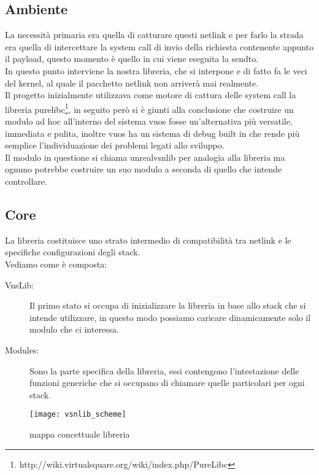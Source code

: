\subsection{Ambiente}
La necessit\`a primaria era quella di catturare questi netlink e per farlo la strada era quella di intercettare la system call di invio della richiesta contenente appunto il payload, questo momento \`e quello in cui viene eseguita la sendto.\\
In questo punto interviene la nostra libreria, che si interpone e di fatto fa le veci del kernel, al quale il pacchetto netlink non arriver\`a mai realmente.\\
Il progetto inizialmente utilizzava come motore di cattura delle system call la libreria purelibc\footnote{http://wiki.virtualsquare.org/wiki/index.php/PureLibc}, in seguito per\`o si \`e giunti alla conclusione che costruire un modulo ad hoc all'interno del sistema vuos fosse un'alternativa pi\`u versatile, immediata e pulita, inoltre vuos ha un sistema di debug built in che rende pi\`u semplice l'individuazione dei problemi legati allo sviluppo.\\
Il modulo in questione si chiama unrealvsnlib per analogia alla libreria ma ognuno potrebbe costruire un suo modulo a seconda di quello che intende controllare.\\

\subsection{Core}
La libreria costituisce uno strato  intermedio di compatibilit\`a tra netlink e le specifiche configurazioni degli stack.\\
Vediamo come \`e composta:
\begin{description}                     %
  \item[VnsLib:] Il primo stato si occupa di inizializzare la libreria in base allo stack che si intende utilizzare, in questo modo possiamo caricare dinamicamente solo il modulo che ci interessa.
  \item[Modules:] Sono la parte specifica della libreria, essi contengono l'intestazione delle funzioni generiche che si occupano di chiamare quelle particolari per ogni stack.
\end{description}
\begin{figure}[h]                       %
\begin{center}                          %
\texttt{[image: vsnlib\_scheme]}%
%
\caption[mappa concettuale libreria]{mappa concettuale libreria}\label{fig:map}
\end{center}
\end{figure}

